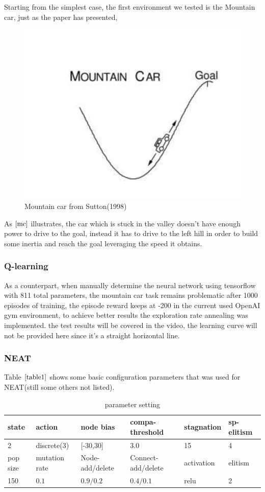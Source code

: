 \documentclass{article}
\begin{document}
Starting from the simplest case, the first environment we tested is the Mountain car, just as the paper has presented,
\begin{figure}[htbp]
  \centering
  \includegraphics[width = .4\textwidth]{Mountaincar}
  \caption{Mountain car from Sutton(1998)}
  \label{mc}
 \end{figure}
As $\ref{mc}$ illustrates, the car which is stuck in the valley doesn't have enough power to drive to the goal, instead it has to drive to the left hill
in order to build some inertia and reach the goal leveraging the speed it obtains.

\subsubsection{Q-learning}

As a counterpart, when manually determine the neural network using tensorflow with 811 total parameters, the mountain car task remains problematic after 1000 episodes of training, the episode reward 
keeps at -200 in the current used OpenAI gym environment, to achieve better results the exploration rate annealing was implemented. the test results will be covered in the video, the learning curve will not be provided here since it's
a straight horizontal line. 

\subsubsection{NEAT}

 Table $\ref{table1}$ shows some basic configuration parameters that was used for NEAT(still some others not listed).
 \begin{table}[htbp]
  \centering
  \caption{parameter setting}
  \label{table1}
  \centering
  \begin{tabular}{llllll}
    \toprule
    \cmidrule(r){1-6}
    state & action &   node bias  &  compa-threshold   & stagnation     &  sp-elitism   \\
    \midrule
   2  & discrete(3) & [-30,30]  & 3.0 & 15 &  4    \\
   \cmidrule(r){1-6}
   pop size & mutation rate & Node-add/delete    & Connect-add/delete    & activation & elitism  \\
    \midrule
   150 & $0.1$ &  $0.9/0.2$  & $0.4/0.1$ & relu &  2    \\
        \bottomrule
  \end{tabular}
\end{table}
\end{document}

